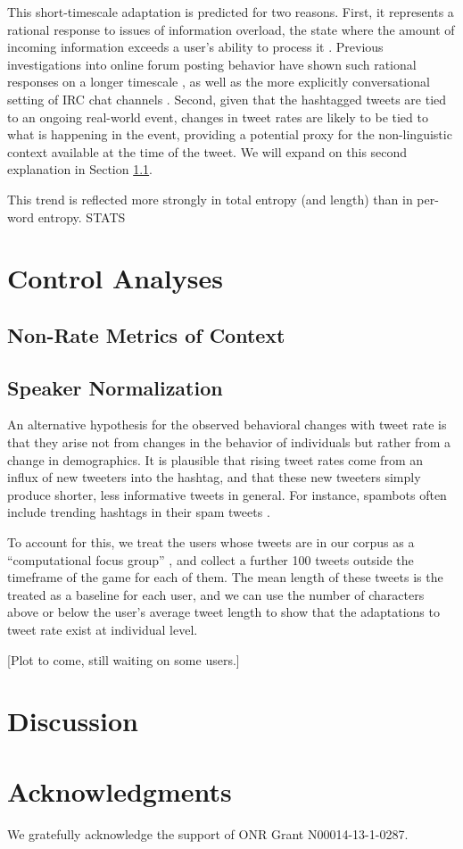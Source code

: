 \documentclass[11pt,letterpaper]{article}
\begin{document}
This short-timescale adaptation is predicted for two reasons. First, it represents a rational response to issues of information overload, the state where the amount of incoming information exceeds a user's ability to process it \cite{miller1956}.  Previous investigations into online forum posting behavior have shown such rational responses on a longer timescale \cite{jones2001a,jones2001b,whittaker2003,schoberth2003}, as well as the more explicitly conversational setting of IRC chat channels \cite{jones2008}.  Second, given that the hashtagged tweets are tied to an ongoing real-world event, changes in tweet rates are likely to be tied to what is happening in the event, providing a potential proxy for the non-linguistic context available at the time of the tweet. We will expand on this second explanation in Section \ref{sect:other-metrics}.

This trend is reflected more strongly in total entropy (and length) than in per-word entropy. STATS

\section{Control Analyses}

\subsection{Non-Rate Metrics of Context}\label{sect:other-metrics}

\subsection{Speaker Normalization}
An alternative hypothesis for the observed behavioral changes with tweet rate is that they arise not from changes in the behavior of individuals but rather from a change in demographics.  It is plausible that rising tweet rates come from an influx of new tweeters into the hashtag, and that these new tweeters simply produce shorter, less informative tweets in general.  For instance, spambots often include trending hashtags in their spam tweets \cite{martinez2013}.

To account for this, we treat the users whose tweets are in our corpus as a ``computational focus group'' \cite{lin2013,lin2014}, and collect a further 100 tweets outside the timeframe of the game for each of them.  The mean length of these tweets is the treated as a baseline for each user, and we can use the number of characters above or below the user's average tweet length to show that the adaptations to tweet rate exist at individual level.

[Plot to come, still waiting on some users.]



\section{Discussion}


\section*{Acknowledgments}

We gratefully acknowledge the support of ONR Grant N00014-13-1-0287.



\end{document}
